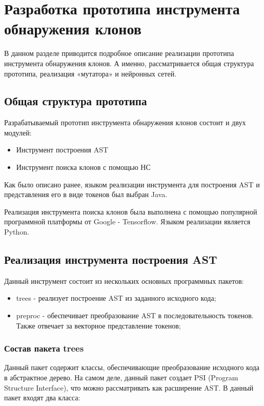 \chapter{Разработка прототипа инструмента обнаружения клонов}

В данном разделе приводится подробное описание реализации прототипа инструмента обнаружения клонов. А именно, рассматривается общая структура прототипа, реализация «мутатора»  и нейронных сетей.

\section{Общая структура прототипа}

Разрабатываемый прототип инструмента обнаружения клонов состоит и двух модулей:
\begin{itemize}
\setlength\itemsep{0mm}
\item Инструмент построения AST
\item Инструмент поиска клонов с помощью НС
\end{itemize}

Как было описано ранее, языком реализации инструмента для построения AST и представления его в виде токенов был выбран Java.

Реализация инструмента поиска клонов была выполнена с помощью популярной программной платформы от Google -  Tensorflow. Языком реализации является Python.

\section{Реализация инструмента построения AST}

Данный инструмент состоит из нескольких основных программных пакетов:

\begin{itemize}
\setlength\itemsep{0mm}
\item trees - реализует построение AST из заданного исходного кода;
\item preproc - обеспечивает преобразование AST в последовательность токенов. Также отвечает за векторное представление токенов;
\end{itemize}

\subsection{Состав пакета trees}

Данный пакет содержит классы, обеспечивающие преобразование исходного кода в абстрактное дерево. На самом деле, данный пакет создает PSI (Program Structure Interface), что можно рассматривать как расширение AST. В данный пакет входят два класса:


